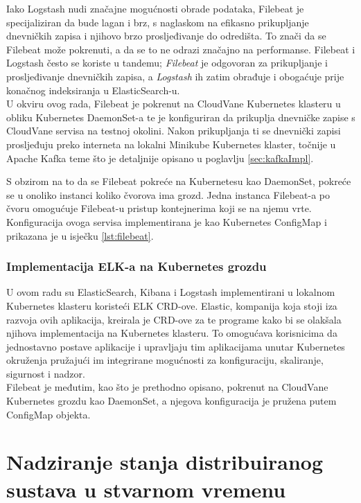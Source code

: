 \documentclass[times, utf8, diplomski]{fer}
\begin{document}
Iako Logstash nudi značajne mogućnosti obrade podataka, Filebeat je specijaliziran da bude lagan i brz, s naglaskom na efikasno prikupljanje dnevničkih zapisa i njihovo brzo prosljeđivanje do odredišta. To znači da se Filebeat može pokrenuti, a da se to ne odrazi značajno na performanse. Filebeat i Logstash često se koriste u tandemu; \emph{Filebeat} je odgovoran za prikupljanje i prosljeđivanje dnevničkih zapisa, a \emph{Logstash} ih zatim obrađuje i obogaćuje prije konačnog indeksiranja u ElasticSearch-u.\\

U okviru ovog rada, Filebeat je pokrenut na CloudVane Kubernetes klasteru u obliku Kubernetes DaemonSet-a te je konfiguriran da prikuplja dnevničke zapise s CloudVane servisa na testnoj okolini. Nakon prikupljanja ti se dnevnički zapisi prosljeđuju preko interneta na lokalni Minikube Kubernetes klaster, točnije u Apache Kafka teme što je detaljnije opisano u poglavlju \ref{sec:kafkaImpl}. 

S obzirom na to da se Filebeat pokreće na Kubernetesu kao DaemonSet, pokreće se u onoliko instanci koliko čvorova ima grozd. Jedna instanca Filebeat-a po čvoru omogućuje Filebeat-u pristup kontejnerima koji se na njemu vrte. Konfiguracija ovoga servisa implementirana je kao Kubernetes ConfigMap i prikazana je u isječku \ref{lst:filebeat}.

\subsection{Implementacija ELK-a na Kubernetes grozdu}
\label{sec:elk_impl}

U ovom radu su ElasticSearch, Kibana i Logstash implementirani u lokalnom Kubernetes klasteru koristeći ELK CRD-ove. Elastic, kompanija koja stoji iza razvoja ovih aplikacija, kreirala je CRD-ove za te programe kako bi se olakšala njihova implementacija na Kubernetes klasteru. To omogućava korisnicima da jednostavno postave aplikacije i upravljaju tim aplikacijama unutar Kubernetes okruženja pružajući im integrirane mogućnosti za konfiguraciju, skaliranje, sigurnost i nadzor.\\

Filebeat je međutim, kao što je prethodno opisano, pokrenut na CloudVane Kubernetes grozdu kao DaemonSet, a njegova konfiguracija je pružena putem ConfigMap objekta.

\chapter{Nadziranje stanja distribuiranog sustava u stvarnom vremenu}
\label{sec:streamingMonitoring}
\end{document}
